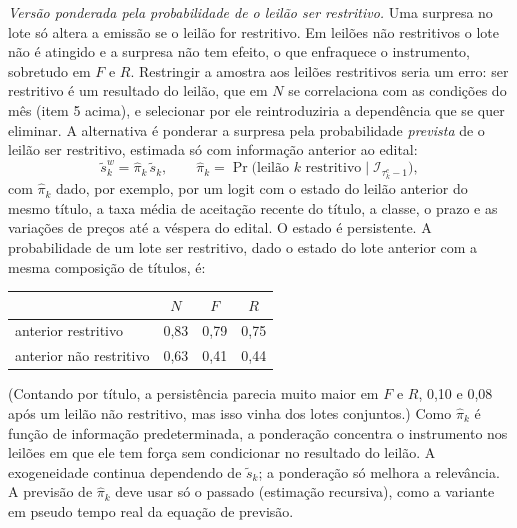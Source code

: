 \documentclass[12pt,a4paper]{article}
\begin{document}
\emph{Versão ponderada pela probabilidade de o leilão ser restritivo.} Uma surpresa
no lote só altera a emissão se o leilão for restritivo. Em leilões não restritivos o
lote não é atingido e a surpresa não tem efeito, o que enfraquece o instrumento,
sobretudo em \(F\) e \(R\). Restringir a amostra aos leilões restritivos seria um
erro: ser restritivo é um resultado do leilão, que em \(N\) se correlaciona com as
condições do mês (item 5 acima), e selecionar por ele reintroduziria a dependência
que se quer eliminar. A
alternativa é ponderar a surpresa pela probabilidade \emph{prevista} de o leilão ser
restritivo, estimada só com informação anterior ao edital:
\[
\tilde s_k^{w}=\hat\pi_k\,\tilde s_k,\qquad
\hat\pi_k=\Pr\bigl(\mbox{leilão }k\mbox{ restritivo}\mid\mathcal{I}_{\tau_k^e-1}\bigr),
\]
com \(\hat\pi_k\) dado, por exemplo, por um logit com o estado do leilão anterior do
mesmo título, a taxa média de aceitação recente do título, a classe, o prazo e as
variações de preços até a véspera do edital. O estado é persistente. A
probabilidade de um lote ser restritivo, dado o estado do lote anterior com a mesma
composição de títulos, é:
\begin{center}
\small
\begin{tabular}{lccc}
\toprule
 & \(N\) & \(F\) & \(R\) \\
\midrule
anterior restritivo & 0,83 & 0,79 & 0,75 \\
anterior não restritivo & 0,63 & 0,41 & 0,44 \\
\bottomrule
\end{tabular}
\end{center}
(Contando por título, a persistência parecia muito maior em \(F\) e \(R\), 0,10 e 0,08
após um leilão não restritivo, mas isso vinha dos lotes conjuntos.) Como \(\hat\pi_k\) é
função de informação predeterminada, a ponderação concentra o instrumento nos
leilões em que ele tem força sem condicionar no resultado do leilão. A
exogeneidade continua dependendo de \(\tilde s_k\); a ponderação só melhora a
relevância. A previsão de \(\hat\pi_k\) deve usar só o passado (estimação
recursiva), como a variante em pseudo tempo real da equação de previsão.
\end{document}
